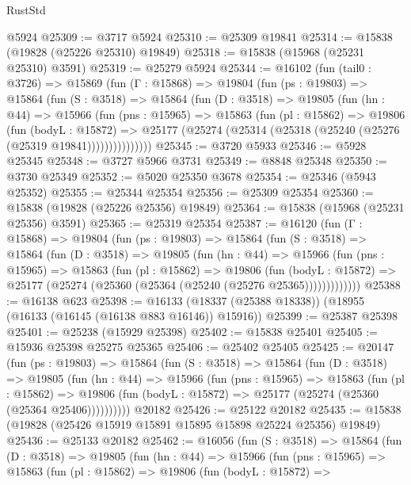 \begin{lexlean}{RustStd}
\begin{coremodule}
    @5924
@25309 := @3717 @5924
@25310 := @25309 @19841
@25314 := @15838 (@19828 (@25226 @25310) @19849)
@25318 := @15838 (@15968 (@25231 @25310) @3591)
@25319 := @25279 @5924
@25344 := @16102
    (fun (tail0 : @3726) =>
    @15869
      (fun (Γ : @15868) =>
      @19804
        (fun (ps : @19803) =>
        @15864
          (fun (S : @3518) =>
          @15864
            (fun (D : @3518) =>
            @19805
              (fun (hn : @44) =>
              @15966
                (fun (pns : @15965) =>
                @15863
                  (fun (pl : @15862) =>
                  @19806
                    (fun (bodyL : @15872) =>
                    @25177 (@25274 (@25314 (@25318 (@25240 (@25276 (@25319 @19841)))))))))))))))
@25345 := @3720 @5933
@25346 := @5928 @25345
@25348 := @3727 @5966 @3731
@25349 := @8848 @25348
@25350 := @3730 @25349
@25352 := @5020 @25350 @3678
@25354 := @25346 (@5943 @25352)
@25355 := @25344 @25354
@25356 := @25309 @25354
@25360 := @15838 (@19828 (@25226 @25356) @19849)
@25364 := @15838 (@15968 (@25231 @25356) @3591)
@25365 := @25319 @25354
@25387 := @16120
    (fun (Γ : @15868) =>
    @19804
      (fun (ps : @19803) =>
      @15864
        (fun (S : @3518) =>
        @15864
          (fun (D : @3518) =>
          @19805
            (fun (hn : @44) =>
            @15966
              (fun (pns : @15965) =>
              @15863
                (fun (pl : @15862) =>
                @19806
                  (fun (bodyL : @15872) =>
                  @25177 (@25274 (@25360 (@25364 (@25240 (@25276 @25365)))))))))))))
@25388 := @16138 @623
@25398 := @16133 (@18337 (@25388 @18338)) (@18955 (@16133 (@16145 (@16138 @883 @16146)) @15916))
@25399 := @25387 @25398
@25401 := @25238 (@15929 @25398)
@25402 := @15838 @25401
@25405 := @15936 @25398 @25275 @25365
@25406 := @25402 @25405
@25425 := @20147
    (fun (ps : @19803) =>
    @15864
      (fun (S : @3518) =>
      @15864
        (fun (D : @3518) =>
        @19805
          (fun (hn : @44) =>
          @15966
            (fun (pns : @15965) =>
            @15863
              (fun (pl : @15862) =>
              @19806 (fun (bodyL : @15872) => @25177 (@25274 (@25360 (@25364 @25406))))))))))
    @20182
@25426 := @25122 @20182
@25435 := @15838 (@19828 (@25426 @15919 @15891 @15895 @15898 @25224 @25356) @19849)
@25436 := @25133 @20182
@25462 := @16056
    (fun (S : @3518) =>
    @15864
      (fun (D : @3518) =>
      @19805
        (fun (hn : @44) =>
        @15966
          (fun (pns : @15965) =>
          @15863
            (fun (pl : @15862) =>
            @19806
              (fun (bodyL : @15872) =>

\end{coremodule}
\end{lexlean}
